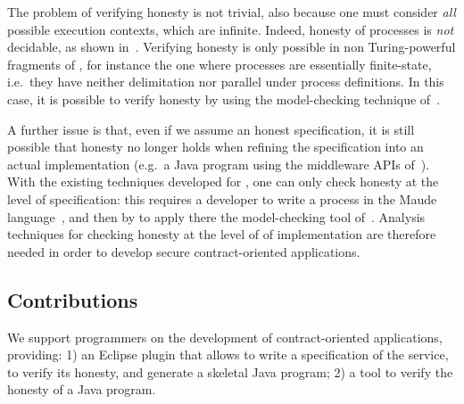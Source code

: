 %
The problem of verifying honesty is not trivial, 
also because one must consider \emph{all} possible execution contexts, 
which are infinite. %
Indeed, honesty of \coco processes is \emph{not} decidable, as shown 
in~\cite{Bartoletti15wsfm}. %
Verifying honesty is only possible in non Turing-powerful fragments of \coco,
for instance the one where processes are essentially finite-state,
i.e.\ they have neither delimitation nor parallel under process definitions. %
In this case, it is possible to verify honesty 
by using the model-checking technique of~\cite{verifiable}. %

A further issue is that, 
even if we assume an honest \coco specification, 
it is still possible that honesty no longer holds 
when refining the specification into an actual implementation 
(e.g.\ a Java program using the middleware APIs of~\cite{CO2middleware}). %
%
With the existing techniques developed for \coco, 
one can only check honesty at the level of specification:
this requires a developer to
write a \coco process in the Maude language~\cite{Maude01},
and then by to apply there the model-checking tool of~\cite{verifiable}. %
Analysis techniques for checking honesty at the level of of implementation
are therefore needed in order to develop secure contract-oriented applications.

\subsection*{Contributions}

We support programmers on the development of contract-oriented 
applications, providing:
1) an Eclipse plugin that allows to write a \coco specification of the service,
to verify its honesty, and generate a skeletal Java program;
2) a tool to verify the honesty of a Java program.

